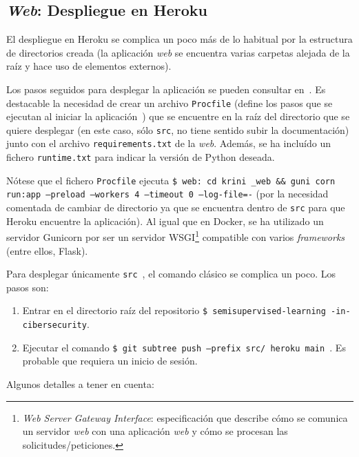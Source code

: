 \subsection{\textit{Web}: Despliegue en Heroku}

El despliegue en Heroku se complica un poco más de lo habitual por la estructura de directorios creada (la aplicación \textit{web} se encuentra varias carpetas alejada de la raíz y hace uso de elementos externos).

Los pasos seguidos para desplegar la aplicación se pueden consultar en~\cite{herokudeploy}. Es destacable la necesidad de crear un archivo \texttt{Procfile} (define los pasos que se ejecutan al iniciar la aplicación~\cite{herokuprocfile}) que se encuentre en la raíz del directorio que se quiere desplegar (en este caso, sólo \texttt{src}, no tiene sentido subir la documentación) junto con el archivo \texttt{requirements.txt} de la \textit{web}. Además, se ha incluído un fichero \texttt{runtime.txt} para indicar la versión de Python deseada.

Nótese que el fichero \texttt{Procfile} ejecuta \texttt{\$ web: cd krini \_web \&\& guni corn run:app --preload --workers 4 --timeout 0 --log-file=-} (por la necesidad comentada de cambiar de directorio ya que se encuentra dentro de \texttt{src} para que Heroku encuentre la aplicación). Al igual que en Docker, se ha utilizado un servidor Gunicorn por ser un servidor WSGI\footnote{\textit{Web Server Gateway Interface}: especificación que describe cómo se comunica un servidor \textit{web} con una aplicación \textit{web} y cómo se procesan las solicitudes/peticiones.} compatible con varios \textit{frameworks} (entre ellos, Flask).

Para desplegar únicamente \texttt{src}~\cite{herokusubtree}, el comando clásico se complica un poco. Los pasos son:

\begin{enumerate}
	\item Entrar en el directorio raíz del repositorio \texttt{\$ semisupervised-learning -in-cibersecurity}.
	\item Ejecutar el comando \texttt{\$ git subtree push --prefix src/ heroku main
	}. Es probable que requiera un inicio de sesión.
\end{enumerate}

Algunos detalles a tener en cuenta:

